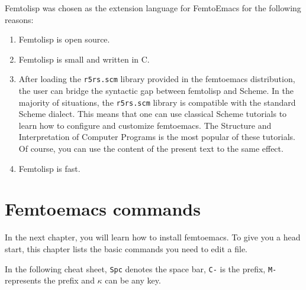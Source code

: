 \documentclass[a4paper,12pt]{book}
\begin{document}
Femtolisp was chosen
as the extension language
for FemtoEmacs for the following reasons:
\begin{enumerate}
\item Femtolisp is open source.
\item Femtolisp is small and written in C.
\item After loading the \verb|r5rs.scm| library
provided in the femtoemacs distribution,
the user can bridge the syntactic gap
between femtolisp and Scheme.
In the majority of situations, the \verb|r5rs.scm|
library is compatible
with the standard Scheme dialect. This means that
one can use classical Scheme tutorials to learn
how to configure and customize femtoemacs.
The Structure and Interpretation of Computer Programs
is the most popular of these tutorials.
Of course, you can use the content of the
present text to the same effect.
\item Femtolisp is fast.
\end{enumerate}    

\mainmatter


\chapter{Femtoemacs commands}
In the next chapter, you will learn how to install
femtoemacs. To give you a head start, this chapter
lists the basic commands you need to edit a file.

In the following cheat sheet, \verb|Spc| denotes
the space bar, \verb|C-| is the  prefix, \verb|M-| represents 
the   prefix and  $\kappa$ can be any key. 
\end{document}
